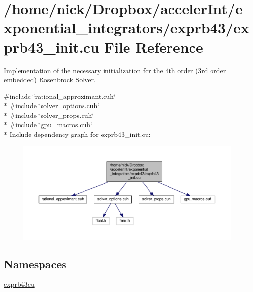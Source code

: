 \hypertarget{exprb43__init_8cu}{}\section{/home/nick/\+Dropbox/acceler\+Int/exponential\+\_\+integrators/exprb43/exprb43\+\_\+init.cu File Reference}
\label{exprb43__init_8cu}


Implementation of the necessary initialization for the 4th order (3rd order embedded) Rosenbrock Solver.  


{\ttfamily \#include \char`\"{}rational\+\_\+approximant.\+cuh\char`\"{}}\\*
{\ttfamily \#include \char`\"{}solver\+\_\+options.\+cuh\char`\"{}}\\*
{\ttfamily \#include \char`\"{}solver\+\_\+props.\+cuh\char`\"{}}\\*
{\ttfamily \#include \char`\"{}gpu\+\_\+macros.\+cuh\char`\"{}}\\*
Include dependency graph for exprb43\+\_\+init.\+cu\+:
\nopagebreak
\begin{figure}[H]
\begin{center}
\leavevmode
\includegraphics[width=350pt]{exprb43__init_8cu__incl}
\end{center}
\end{figure}
\subsection*{Namespaces}
\begin{DoxyCompactItemize}
\item 
 \hyperlink{namespaceexprb43cu}{exprb43cu}
\end{DoxyCompactItemize}
